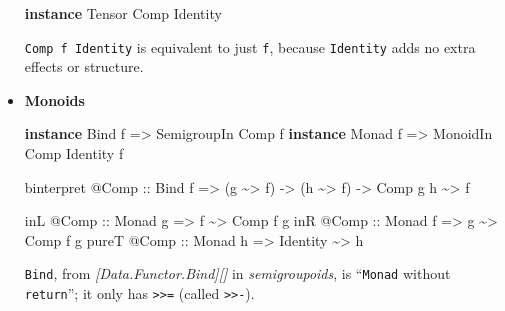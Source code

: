 \documentclass[]{article}
\newenvironment{Shaded}{}{}
\newcommand{\DataTypeTok}[1]{\textcolor[rgb]{0.56,0.13,0.00}{#1}}
\newcommand{\KeywordTok}[1]{\textcolor[rgb]{0.00,0.44,0.13}{\textbf{#1}}}
\newcommand{\NormalTok}[1]{#1}
\newcommand{\OperatorTok}[1]{\textcolor[rgb]{0.40,0.40,0.40}{#1}}
\newcommand{\OtherTok}[1]{\textcolor[rgb]{0.00,0.44,0.13}{#1}}
\begin{document}
\begin{itemize}
\begin{Shaded}
\begin{Highlighting}[]
\KeywordTok{instance} \DataTypeTok{Tensor} \DataTypeTok{Comp} \DataTypeTok{Identity}
\end{Highlighting}
\end{Shaded}

  \texttt{Comp\ f\ Identity} is equivalent to just \texttt{f}, because
  \texttt{Identity} adds no extra effects or structure.
\item
  \textbf{Monoids}

\begin{Shaded}
\begin{Highlighting}[]
\KeywordTok{instance} \DataTypeTok{Bind}\NormalTok{  f }\OtherTok{=\textgreater{}} \DataTypeTok{SemigroupIn} \DataTypeTok{Comp}\NormalTok{ f}
\KeywordTok{instance} \DataTypeTok{Monad}\NormalTok{ f }\OtherTok{=\textgreater{}} \DataTypeTok{MonoidIn}    \DataTypeTok{Comp} \DataTypeTok{Identity}\NormalTok{ f}

\NormalTok{binterpret }\OperatorTok{@}\DataTypeTok{Comp}
\OtherTok{    ::} \DataTypeTok{Bind}\NormalTok{ f}
    \OtherTok{=\textgreater{}}\NormalTok{ (g }\OperatorTok{\textasciitilde{}\textgreater{}}\NormalTok{ f)}
    \OtherTok{{-}\textgreater{}}\NormalTok{ (h }\OperatorTok{\textasciitilde{}\textgreater{}}\NormalTok{ f)}
    \OtherTok{{-}\textgreater{}} \DataTypeTok{Comp}\NormalTok{ g h }\OperatorTok{\textasciitilde{}\textgreater{}}\NormalTok{ f}

\NormalTok{inL   }\OperatorTok{@}\DataTypeTok{Comp}\OtherTok{ ::} \DataTypeTok{Monad}\NormalTok{ g }\OtherTok{=\textgreater{}}\NormalTok{ f        }\OperatorTok{\textasciitilde{}\textgreater{}} \DataTypeTok{Comp}\NormalTok{ f g}
\NormalTok{inR   }\OperatorTok{@}\DataTypeTok{Comp}\OtherTok{ ::} \DataTypeTok{Monad}\NormalTok{ f }\OtherTok{=\textgreater{}}\NormalTok{ g        }\OperatorTok{\textasciitilde{}\textgreater{}} \DataTypeTok{Comp}\NormalTok{ f g}
\NormalTok{pureT }\OperatorTok{@}\DataTypeTok{Comp}\OtherTok{ ::} \DataTypeTok{Monad}\NormalTok{ h }\OtherTok{=\textgreater{}} \DataTypeTok{Identity} \OperatorTok{\textasciitilde{}\textgreater{}}\NormalTok{ h}
\end{Highlighting}
\end{Shaded}

  \texttt{Bind}, from \emph{{[}Data.Functor.Bind{]}{[}{]}} in
  \emph{semigroupoids}, is ``\texttt{Monad} without \texttt{return}''; it only
  has \texttt{\textgreater{}\textgreater{}=} (called
  \texttt{\textgreater{}\textgreater{}-}).


\end{itemize}
\end{document}
